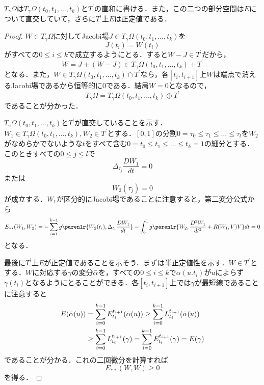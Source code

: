 \documentclass[uplatex]{jsarticle}
\begin{document}
\begin{proposition}
$T_\gamma \Omega$は$T_\gamma \Omega(t_0,t_1,\dots ,t_k)$と$T^\prime$の直和に書ける．また，この二つの部分空間は$E$について直交していて，さらに$T^\prime$上$E$は正定値である．
\end{proposition}
\begin{proof}
$W \in T_\gamma \Omega$に対してJacobi場$J\in T_\gamma \Omega(t_0,t_1,\dots ,t_k)$を
\[ J(t_i) = W(t_i) \]
がすべての$0\leq i\leq k$で成立するようにとる．すると$W-J \in T^\prime$だから，
\[ W = J+(W-J) \in T_\gamma \Omega(t_0,t_1,\dots ,t_k) + T^\prime \]
となる．また，$W\in T_\gamma \Omega(t_0,t_1,\dots ,t_k) \cap T^\prime$なら，各$[t_i,t_{i+1}]$上$W$は端点で消えるJacobi場であるから恒等的に0である．結局$W = 0$となるので，
\[ T_\gamma \Omega = T_\gamma \Omega(t_0,t_1,\dots ,t_k) \oplus T^\prime \]
であることが分かった．

$T_\gamma \Omega(t_0,t_1,\dots ,t_k)$と$T^\prime$が直交していることを示す．$W_1\in T_\gamma \Omega(t_0,t_1,\dots ,t_k),W_2\in T^\prime$とする．$[0,1]$の分割$0=\tau_0\leq \tau_1 \leq \dots \leq \tau_l$を$W_2$がなめらかでないような$t$をすべて含む$0 = t_0 \leq t_1 \leq \dots \leq t_k = 1$の細分とする．このときすべての$0\leq j\leq l$で
\[ \Delta_{\tau_j} \frac{DW_1}{dt} = 0 \]
または
\[ W_2(\tau_j) = 0 \]
が成立する．$W_1$が区分的にJacobi場であることに注意すると，第二変分公式から
\begin{align*}
    E_{\ast \ast}(W_1,W_2) 
   =-\sum_{i=1}^{k-1} g\parenlr{W_2(t_i),\Delta_{t_i} \frac{DW_1}{dt}}
      -\int_0^1 g\parenlr{W_2,\frac{D^2W_1}{dt^2}+R(W_1,V)V}dt = 0
\end{align*}
となる．

最後に$T^\prime$上$E$が正定値であることを示そう．まずは半正定値性を示す．$W\in T^\prime$とする．$W$に対応する$\gamma$の変分$\Bar{\alpha}$を，すべての$0\leq i\leq k$で$\alpha(u.t_i)$が$u$によらず$\gamma(t_i)$となるようにとることができる．各$[t_i,t_{i+1}]$上では$\gamma$が最短線であることに注意すると
\begin{align*}
    E(\Bar{\alpha}(u)) &= \sum_{i=0}^{k-1} E_{t_i}^{t_{i+1}}(\Bar{\alpha}(u))
        \geq \sum_{i=0}^{k-1} L_{t_i}^{t_{i+1}}(\Bar{\alpha}(u)) \\
    &\geq \sum_{i=0}^{k-1} L_{t_i}^{t_{i+1}}(\gamma) = \sum_{i=0}^{k-1} E_{t_i}^{t_{i+1}}(\gamma)
        = E(\gamma)
\end{align*}
であることが分かる．これの二回微分を計算すれば
\[ E_{\ast \ast}(W,W) \geq 0 \]
を得る．


\end{proof}
\end{document}
